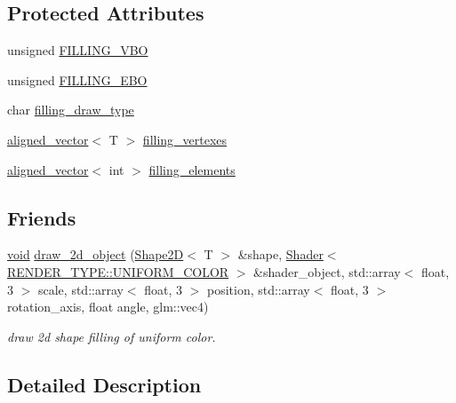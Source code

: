 \subsection*{Protected Attributes}
\begin{DoxyCompactItemize}
\item 
unsigned \mbox{\hyperlink{classShape2D_a220cf4cf96da8bd43627ffffd00a0718}{F\+I\+L\+L\+I\+N\+G\+\_\+\+V\+BO}}
\item 
unsigned \mbox{\hyperlink{classShape2D_affa1082cd6e91cce5af4cb10c1b3435f}{F\+I\+L\+L\+I\+N\+G\+\_\+\+E\+BO}}
\item 
char \mbox{\hyperlink{classShape2D_ab24ceddaa0114eda3ae699f8fb3503ca}{filling\+\_\+draw\+\_\+type}}
\item 
\mbox{\hyperlink{type__definitions_8hpp_a087efd587d66b881646ef378f1919c90}{aligned\+\_\+vector}}$<$ T $>$ \mbox{\hyperlink{classShape2D_ae3e216c9d8422b47f46bff9259bd17be}{filling\+\_\+vertexes}}
\item 
\mbox{\hyperlink{type__definitions_8hpp_a087efd587d66b881646ef378f1919c90}{aligned\+\_\+vector}}$<$ int $>$ \mbox{\hyperlink{classShape2D_a28d0d6018cb6b73637050d9f3fb1f006}{filling\+\_\+elements}}
\end{DoxyCompactItemize}
\subsection*{Friends}
\begin{DoxyCompactItemize}
\item 
\mbox{\hyperlink{glad_8h_a950fc91edb4504f62f1c577bf4727c29}{void}} \mbox{\hyperlink{classShape2D_a75ed525e537ded17d42e3adad87bd701}{draw\+\_\+2d\+\_\+object}} (\mbox{\hyperlink{classShape2D}{Shape2D}}$<$ T $>$ \&shape, \mbox{\hyperlink{classShader}{Shader}}$<$ \mbox{\hyperlink{shader__class_8hpp_a24e288e18eb7b6e01de7565001fedb60aa98862073f71a928bad5099cc3e1c2ed}{R\+E\+N\+D\+E\+R\+\_\+\+T\+Y\+P\+E\+::\+U\+N\+I\+F\+O\+R\+M\+\_\+\+C\+O\+L\+OR}} $>$ \&shader\+\_\+object, std\+::array$<$ float, 3 $>$ scale, std\+::array$<$ float, 3 $>$ position, std\+::array$<$ float, 3 $>$ rotation\+\_\+axis, float angle, glm\+::vec4)
\begin{DoxyCompactList}\small\item\em draw 2d shape filling of uniform color. \end{DoxyCompactList}\end{DoxyCompactItemize}


\subsection{Detailed Description}
